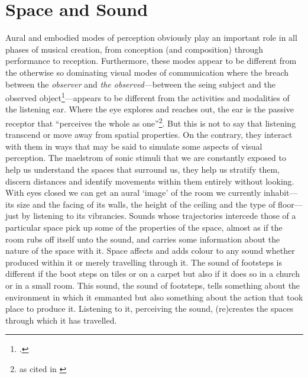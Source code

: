 \section{Space and Sound}
\label{sec:spaceandsound}

Aural and embodied modes of perception obviously play an important role in all phases of musical creation, from conception (and composition) through performance to reception. Furthermore, these modes appear to be different from the otherwise so dominating visual modes of communication where the breach between the \emph{observer} and \emph{the observed}---between the seing subject and the observed object\footcite[For an artistic investigation on the topic, see][]{leiderstam06}---appears to be different from the activities and modalities of the listening ear. Where the eye explores and reaches out, the ear is the passive receptor that ``perceives the whole as one''\footnote{\cite{berendt90} as cited in \cite[139]{cobussen08}}.
But this is not to say that listening transcend or move away from spatial properties. On the contrary, they interact with them in ways that may be said to simulate some aspects of visual perception. The maelstrom of sonic stimuli that we are constantly exposed to help us understand the spaces that surround us, they help us stratify them, discern distances and identify movements within them entirely without looking. With eyes closed we can get an aural `image' of the room we currently inhabit---its size and the facing of its walls, the height of the ceiling and the type of floor---just by listening to its vibrancies.  Sounds whose trajectories intercede those of a particular space pick up some of the properties of the space, almost as if the room rubs off itself unto the sound, and carries some information about the nature of the space with it. Space affects and adds colour to any sound whether produced within it or merely travelling through it. The sound of footsteps is different if the boot steps on tiles or on a carpet but also if it does so in a church or in a small room. 
This sound, the sound of footsteps, tells something about the environment in which it emmanted but also something about the action that took place to produce it. Listening to it, perceiving the sound, (re)creates the spaces through which it has travelled. 

